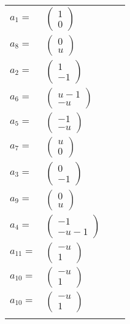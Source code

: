 \documentclass[1p]{elsarticle_modified}
\theoremstyle{definition}
\begin{document}
\begin{tabular}{m{7pt} m{180pt} m{7pt} m{180pt} }
\flushright $a_{1}=$&$\begin{pmatrix}1\\0\end{pmatrix}$ \\
\flushright $a_{8}=$&$\begin{pmatrix}0\\u\end{pmatrix}$ \\
\flushright $a_{2}=$&$\begin{pmatrix}1\\-1\end{pmatrix}$ \\
\flushright $a_{6}=$&$\begin{pmatrix}u-1\\- u\end{pmatrix}$ \\
\flushright $a_{5}=$&$\begin{pmatrix}-1\\- u\end{pmatrix}$ \\
\flushright $a_{7}=$&$\begin{pmatrix}u\\0\end{pmatrix}$ \\
\flushright $a_{3}=$&$\begin{pmatrix}0\\-1\end{pmatrix}$ \\
\flushright $a_{9}=$&$\begin{pmatrix}0\\u\end{pmatrix}$ \\
\flushright $a_{4}=$&$\begin{pmatrix}-1\\- u-1\end{pmatrix}$ \\
\flushright $a_{11}=$&$\begin{pmatrix}- u\\1\end{pmatrix}$ \\
\flushright $a_{10}=$&$\begin{pmatrix}- u\\1\end{pmatrix}$\\ \flushright $a_{10}=$&$\begin{pmatrix}- u\\1\end{pmatrix}$\\&\end{tabular}
\end{document}
